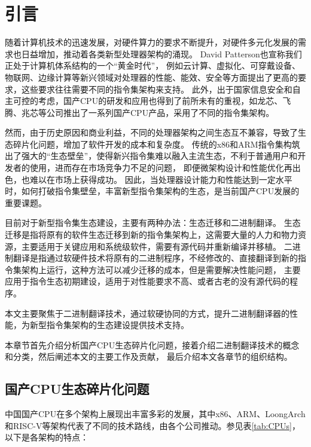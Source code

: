 \chapter{引言}\label{chap:introduction}


随着计算机技术的迅速发展，对硬件算力的要求不断提升，对硬件多元化发展的需求也日益增加，推动着各类新型处理器架构的涌现。
David Patterson也宣称我们正处于计算机体系结构的一个“黄金时代”\cite{goldenage}，
例如云计算、虚拟化、可穿戴设备、物联网、边缘计算等新兴领域对处理器的性能、能效、安全等方面提出了更高的要求，这些要求往往需要不同的指令集架构来支持。
此外，出于国家信息安全和自主可控的考虑，国产CPU的研发和应用也得到了前所未有的重视，如龙芯、飞腾、兆芯等公司推出了一系列国产CPU产品，采用了不同的指令集架构。

然而，由于历史原因和商业利益，不同的处理器架构之间生态互不兼容，导致了生态碎片化问题，增加了软件开发的成本和复杂度。
传统的x86和ARM指令集构筑出了强大的“生态壁垒”，使得新兴指令集难以融入主流生态，不利于普通用户和开发者的使用，进而存在市场竞争力不足的问题，
即便微架构设计和性能优化再出色，也难以在市场上获得成功。
因此，当处理器设计能力和性能达到一定水平时，如何打破指令集壁垒，丰富新型指令集架构的生态，是当前国产CPU发展的重要课题。

目前对于新型指令集生态建设，主要有两种办法：生态迁移和二进制翻译。
生态迁移是指将原有的软件生态迁移到新的指令集架构上，这需要大量的人力和物力资源，主要适用于关键应用和系统级软件，需要有源代码并重新编译并移植。
二进制翻译是指通过软硬件技术将原有的二进制程序，不经修改的、直接翻译到新的指令集架构上运行，这种方法可以减少迁移的成本，但是需要解决性能问题，
主要应用于指令生态初期建设，适用于对性能要求不高、或者古老的没有源代码的程序。

本文主要聚焦于二进制翻译技术，通过软硬协同的方式，提升二进制翻译器的性能，为新型指令集架构的生态建设提供技术支持。

本章节首先介绍分析国产CPU生态碎片化问题，接着介绍二进制翻译技术的概念和分类，然后阐述本文的主要工作及贡献，
最后介绍本文各章节的组织结构。

\section{国产CPU生态碎片化问题}

中国国产CPU在多个架构上展现出丰富多彩的发展，其中x86、ARM、LoongArch\cite{LoongArch2023}和RISC-V等架构代表了不同的技术路线，由各个公司推动。参见表\ref{tab:CPUs}，以下是各架构的特点：

